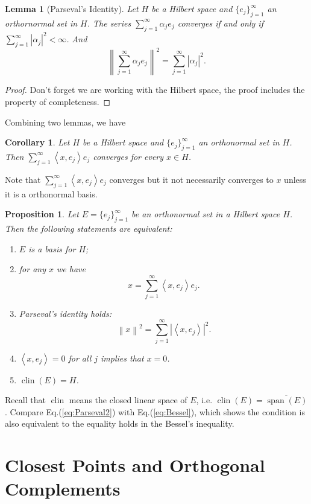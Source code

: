 \documentclass[12pt,a4paper]{article}
\numberwithin{equation}{section}
\theoremstyle{mystyle}
\newtheorem{lemma}[definition]{Lemma}
\newtheorem{corollary}[definition]{Corollary}
\newtheorem{proposition}[definition]{Proposition}
\newcommand{\abs}[1]{\left\lvert #1 \right\rvert}
\newcommand{\norm}[1]{\left\lVert #1 \right\rVert}
\newcommand{\inner}[1]{\left\langle #1 \right\rangle}
\newcommand{\clin}{\operatorname{clin}}
\newcommand{\spn}{\operatorname{span}}
\begin{document}
	\begin{lemma}[Parseval's Identity]
		Let $H$ be a Hilbert space and $\{e_j\}_{j=1}^\infty$ an orthornormal set in $H$. The series $\sum_{j=1}^\infty \alpha_j e_j$ converges if and only if $\sum_{j=1}^\infty \abs{\alpha_j}^2<\infty$. And 
		\begin{equation}
			\norm{\sum_{j=1}^\infty \alpha_j e_j}^2=\sum_{j=1}^\infty \abs{\alpha_j}^2.
		\end{equation}
	\end{lemma}
	\begin{proof}
		Don't forget we are working with the Hilbert space, the proof includes the property of completeness.
	\end{proof}

	Combining two lemmas, we have
	\begin{corollary}
		Let $H$ be a Hilbert space and $\{e_j\}_{j=1}^\infty$ an orthonormal set in $H$. Then $\sum_{j=1}^\infty \inner{x,e_j}e_j$ converges for every $x\in H$.
	\end{corollary}
	Note that $\sum_{j=1}^\infty \inner{x,e_j}e_j$ converges but it not necessarily converges to $x$ unless it is a orthonormal basis.
	\begin{proposition}
		Let $E=\{e_j\}_{j=1}^\infty$ be an orthonormal set in a Hilbert space $H$. Then the following statements are equivalent:
		\begin{enumerate}
			\item $E$ is a basis for $H$;
			\item for any $x$ we have
			\begin{equation}
				x=\sum_{j=1}^\infty \inner{x,e_j}e_j.
			\end{equation}
			\item Parseval's identity holds:
			\begin{equation}
				\norm{x}^2=\sum_{j=1}^\infty \abs{\inner{x,e_j}}^2.\label{eq:Parseval2}
			\end{equation}
			\item $\inner{x,e_j}=0$ for all $j$ implies that $x=0$.
			\item $\clin(E)=H$.
		\end{enumerate}
	\end{proposition}
	Recall that $\clin$ means the closed linear space of $E$, i.e. $\clin(E)=\overline{\spn(E)}$. Compare Eq.(\ref{eq:Parseval2}) with Eq.(\ref{eq:Bessel}), which shows the condition is also equivalent to the equality holds in the Bessel's inequality.
	
	
	
	\section{Closest Points and Orthogonal Complements}
	
	
	
	
	
	
	\appendix
	
	 
\end{document}
